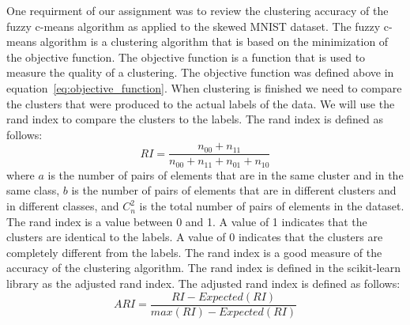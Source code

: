 One requirment of our assignment was to review the clustering accuracy of the fuzzy c-means algorithm as applied to the skewed MNIST dataset.
The fuzzy c-means algorithm is a clustering algorithm that is based on the minimization of the objective function. 
The objective function is a function that is used to measure the quality of a clustering. The objective function was defined above in equation~\ref{eq:objective_function}.
When clustering is finished we need to compare the clusters that were produced to the actual labels of the data. We will use the rand index to compare the clusters to the labels. The rand index is defined as follows:
\begin{equation}
\label{eq:rand_index}
RI = \frac{n_{00} + n_{11}}{n_{00} + n_{11} +n_{01} + n_{10}} 
\end{equation}
where $a$ is the number of pairs of elements that are in the same cluster and in the same class, $b$ is the number of pairs of elements that are in different clusters and in different classes, and $C_{n}^{2}$ is the total number of pairs of elements in the dataset. The rand index is a value between 0 and 1. A value of 1 indicates that the clusters are identical to the labels. A value of 0 indicates that the clusters are completely different from the labels. The rand index is a good measure of the accuracy of the clustering algorithm. The rand index is defined in the scikit-learn library as the adjusted rand index. The adjusted rand index is defined as follows:
\begin{equation}
\label{eq:adjusted_rand_index}
ARI = \frac{RI - Expected(RI)}{max(RI) - Expected(RI)}
\end{equation}




